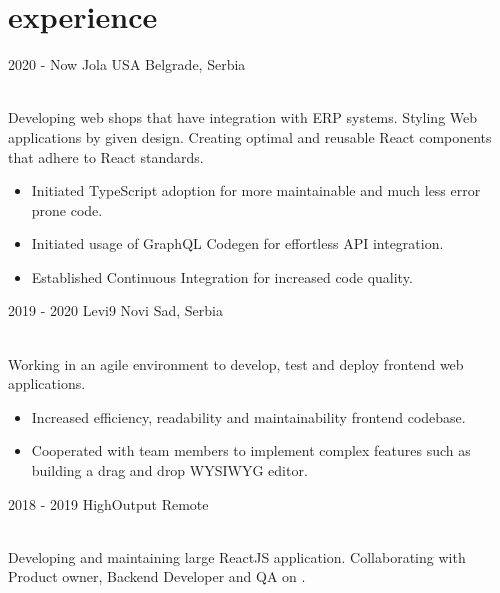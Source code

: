 \documentclass[openany]{cv-style}          %
\begin{document}

\section{experience}

\begin{entrylist}
  \entry
  {2020 - Now}
  {Jola USA}
  {Belgrade, Serbia}
  {\\
    Developing web shops that have integration with ERP systems. Styling Web applications by given design. Creating optimal and reusable React components that adhere to React standards.\\
    \subtitle{Detailed achievements:}
    \begin{itemize}
      \item Initiated TypeScript adoption for more maintainable and much less error prone code.
      \item Initiated usage of GraphQL Codegen for effortless API integration.
      \item Established Continuous Integration for increased code quality.
    \end{itemize}}
  \entry
  {2019 - 2020}
  {Levi9}
  {Novi Sad, Serbia}
  {\\
    Working in an agile environment to develop, test and deploy frontend web applications.\\
    \subtitle{Detailed achievements:}
    \begin{itemize}
      \item Increased efficiency, readability and maintainability frontend codebase.
      \item Cooperated with team members to implement complex features such as building a drag and drop WYSIWYG editor.
    \end{itemize}}
  \entry
  {2018 - 2019}
  {HighOutput}
  {Remote}
  {\\
    Developing and maintaining large ReactJS application. Collaborating with Product owner, Backend Developer and QA on .\\
    \subtitle{Detailed achievements:}
}
\end{entrylist}
\end{document}
